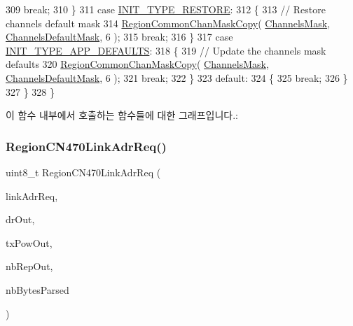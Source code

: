 \begin{DoxyCode}
309             \textcolor{keywordflow}{break};
310         \}
311         \textcolor{keywordflow}{case} \mbox{\hyperlink{group___r_e_g_i_o_n_gga11ecad794560a3d3961bdf1c9a27d3b2aed3218cb3c4ebbb74a1b48e4f8ac8599}{INIT\_TYPE\_RESTORE}}:
312         \{
313             \textcolor{comment}{// Restore channels default mask}
314             \mbox{\hyperlink{group___r_e_g_i_o_n_c_o_m_m_o_n_ga95f5199d490113269fae7f2e0569e9a0}{RegionCommonChanMaskCopy}}( \mbox{\hyperlink{_region_c_n470_8c_a2188957b5ca6af8092154d7ccbfa5757}{ChannelsMask}}, 
      \mbox{\hyperlink{_region_c_n470_8c_ac127b19779301713d5ed92eb03366a2d}{ChannelsDefaultMask}}, 6 );
315             \textcolor{keywordflow}{break};
316         \}
317         \textcolor{keywordflow}{case} \mbox{\hyperlink{group___r_e_g_i_o_n_gga11ecad794560a3d3961bdf1c9a27d3b2a3d260b94611dd833c5243c16ca26c3f0}{INIT\_TYPE\_APP\_DEFAULTS}}:
318         \{
319             \textcolor{comment}{// Update the channels mask defaults}
320             \mbox{\hyperlink{group___r_e_g_i_o_n_c_o_m_m_o_n_ga95f5199d490113269fae7f2e0569e9a0}{RegionCommonChanMaskCopy}}( \mbox{\hyperlink{_region_c_n470_8c_a2188957b5ca6af8092154d7ccbfa5757}{ChannelsMask}}, 
      \mbox{\hyperlink{_region_c_n470_8c_ac127b19779301713d5ed92eb03366a2d}{ChannelsDefaultMask}}, 6 );
321             \textcolor{keywordflow}{break};
322         \}
323         \textcolor{keywordflow}{default}:
324         \{
325             \textcolor{keywordflow}{break};
326         \}
327     \}
328 \}
\end{DoxyCode}
이 함수 내부에서 호출하는 함수들에 대한 그래프입니다.\+:
\mbox{\label{group___r_e_g_i_o_n_c_n470_ga8390f178b68e708cd9741caba00cb05d}} 
\subsubsection{\texorpdfstring{Region\+C\+N470\+Link\+Adr\+Req()}{RegionCN470LinkAdrReq()}}
{\footnotesize\ttfamily uint8\+\_\+t Region\+C\+N470\+Link\+Adr\+Req (\begin{DoxyParamCaption}\item[{\mbox{\hyperlink{group___r_e_g_i_o_n_gad4af503e8d4de1846129e26a799a1e8e}{Link\+Adr\+Req\+Params\+\_\+t}} $\ast$}]{link\+Adr\+Req,  }\item[{int8\+\_\+t $\ast$}]{dr\+Out,  }\item[{int8\+\_\+t $\ast$}]{tx\+Pow\+Out,  }\item[{uint8\+\_\+t $\ast$}]{nb\+Rep\+Out,  }\item[{uint8\+\_\+t $\ast$}]{nb\+Bytes\+Parsed }\end{DoxyParamCaption})}



